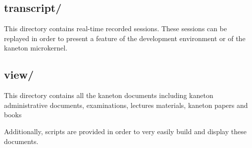 %
%

\subsection*{transcript/}

This directory contains real-time recorded sessions. These sessions can be
replayed in order to present a feature of the development environment or
of the kaneton microkernel.

%
%

\subsection*{view/}

This directory contains all the kaneton documents including kaneton
administrative documents, examinations, lectures materials, kaneton papers
and books \etc{}

Additionally, scripts are provided in order to very easily build and
display these documents.
